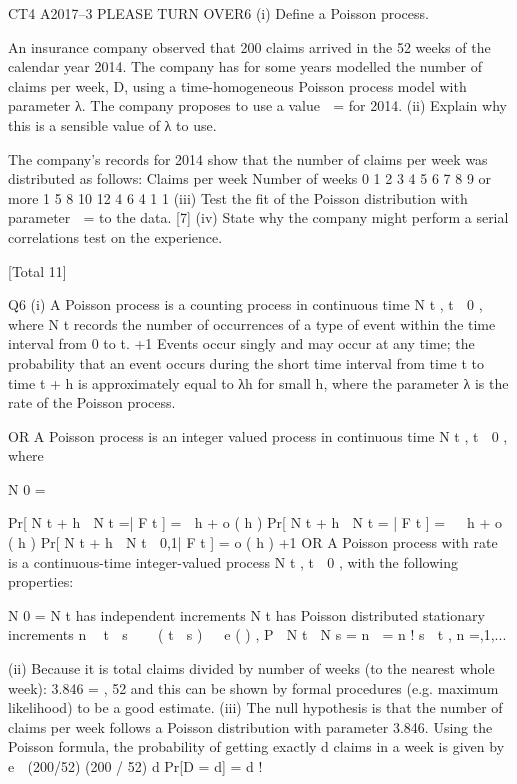 \documentclass[a4paper,12pt]{article}
\begin{document}
CT4 A2017–3
PLEASE TURN OVER6
(i)
Define a Poisson process.

An insurance company observed that 200 claims arrived in the 52 weeks of the
calendar year 2014. The company has for some years modelled the number of claims
per week, D, using a time-homogeneous Poisson process model with parameter λ.
The company proposes to use a value  \;= for 2014.
(ii)
Explain why this is a sensible value of λ to use.

The company’s records for 2014 show that the number of claims per week was
distributed as follows:
Claims
per week Number of weeks
0
1
2
3
4
5
6
7
8
9 or more 1
5
8
10
12
4
6
4
1
1
(iii) Test the fit of the Poisson distribution with parameter  \;= to the data.
[7]
(iv) State why the company might perform a serial correlations test on the
experience.

[Total 11]

Q6
(i)
A Poisson process is a counting process in continuous time { N t , t  0} ,
where N t records the number of occurrences of a type of event within
the time interval from 0 to t. +1
Events occur singly and may occur at any time; 
the probability that an event occurs during the short time interval from time t
to time t + h is approximately equal to λh for small h, where the parameter λ is
the rate of the Poisson process.

OR
A Poisson process is an integer valued process in continuous time { N t , t  0} ,
where

N 0 \;=

Pr[ N t + h  N t \;=| F t ] \;=\;  h + o ( h )
Pr[ N t + h  N t \;= | F t ] \;=   h + o ( h )
Pr[ N t + h  N t  0,1| F t ] \;=\; o ( h )
+1
OR
A Poisson process with rate  is a continuous-time integer-valued process
N t , t  0 , with the following properties:

N 0 \;= 
N t has independent increments 
N t has Poisson distributed stationary increments
n  t  s
   ( t  s )   e ( )
,
P  N t  N s \;=\; n  \;=\;
n !
s  t , n \;=,1,...


(ii)
Because it is total claims divided by number of weeks (to the nearest whole
week):
3.846 \;=
,
52
and this can be shown by formal procedures (e.g. maximum likelihood)
to be a good estimate.
(iii)
The null hypothesis is that the number of claims per week follows a
Poisson distribution with parameter 3.846.
Using the Poisson formula, the probability of getting exactly d claims
in a week is given by
e  (200/52) (200 / 52) d
Pr[D = d] =
d !
\end{document}
